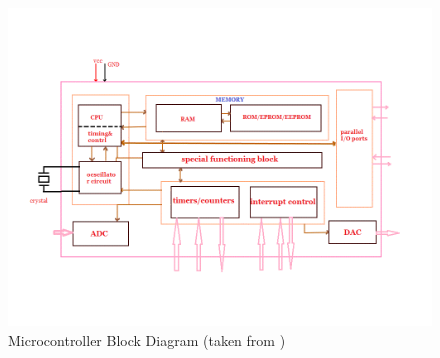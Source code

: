 \documentclass{report}
\begin{document}
	\begin{figure}[h!]
	\centering
	\includegraphics[scale=0.5]{images/mcudia.png}
	\caption{Microcontroller Block Diagram (taken from  \cite{mcudia})}
	\label{mcudia}
	\end{figure}
\end{document}
